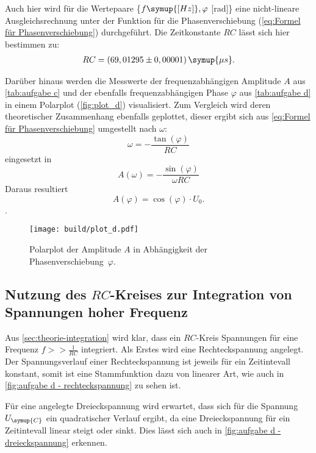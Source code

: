 Auch hier wird für die Wertepaare \{$f \symup{[Hz]}, \varphi$ [rad]\} eine nicht-lineare Ausgleichsrechnung unter 
der Funktion für die Phasenverschiebung (\autoref{eq:Formel für Phasenverschiebung}) durchgeführt. Die Zeitkonstante $RC$ lässt 
sich hier bestimmen zu:
\begin{gather}
  RC = (69,01295\pm0,00001)\,\symup{\mu s}.
\end{gather}

Darüber hinaus werden die Messwerte der frequenzabhängigen Amplitude $A$ aus \autoref{tab:aufgabe c} und der
ebenfalls frequenzabhängigen Phase $\varphi$ aus \autoref{tab:aufgabe d} in einem Polarplot (\autoref{fig:plot_d})
visualisiert.
Zum Vergleich wird deren theoretischer Zusammenhang ebenfalls geplottet, dieser ergibt sich aus \autoref{eq:Formel für Phasenverschiebung}
umgestellt nach $\omega$:
\begin{equation}
  \omega = -\frac{\tan(\varphi)}{RC}
\end{equation}
eingesetzt in
\begin{equation}
  A(\omega) = -\frac{\sin(\varphi)}{\omega RC}
\end{equation}
Daraus resultiert
\begin{equation}
  A(\varphi) = \cos (\varphi) \cdot U_{0}.
\end{equation}.


\begin{figure} [H]
  \centering
  \texttt{[image: build/plot\_d.pdf]}
  \caption{Polarplot der Amplitude $A$ in Abhängigkeit der Phasenverschiebung~$\varphi$.}
  \label{fig:plot_d}
\end{figure}

\subsection{Nutzung des $RC$-Kreises zur Integration von Spannungen hoher Frequenz}
Aus \autoref{sec:theorie-integration} wird klar, dass ein $RC$-Kreis Spannungen für eine Frequenz $f >> \frac{1}{RC}$
integriert. Als Erstes wird eine Rechteckspannung angelegt. Der Spannungsverlauf einer Rechteckspannung ist jeweils für ein
Zeitintevall konstant, somit ist eine Stammfunktion dazu von linearer Art, wie auch in \autoref{fig:aufgabe d - rechteckspannung}
zu sehen ist.

Für eine angelegte Dreieckspannung wird erwartet, dass sich für die Spannung $U_{\symup{C}}$ ein quadratischer Verlauf ergibt,
da eine Dreieckspannung für ein Zeitintevall linear steigt oder sinkt. Dies lässt sich auch in \autoref{fig:aufgabe d - dreieckspannung}
erkennen.

